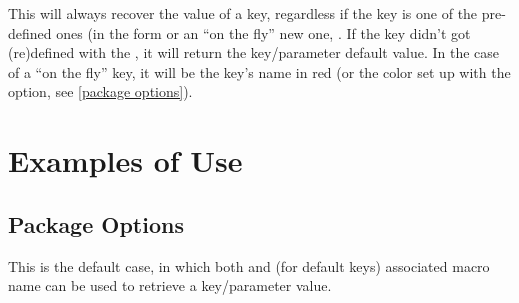 \documentclass[10pt]{article}
\begin{document}
\begin{codedescribe}{\QuestVal}
\begin{codesyntax}%
\end{codesyntax}
This will always recover the value of a key, regardless if the key is one of the pre-defined ones (in the form  or an ``on the fly'' new one, .
If the key didn't got (re)defined with the , it will return the key/parameter default value. In the case of a ``on the fly'' key, it will be the key's name in red (or the color set up with the  option, see \ref{package options}).

\end{codedescribe}

\section{Examples of Use}



\subsection{Package Options}
\begin{codestore}
\usepackage{tikzquests}
\end{codestore}

This is the default case, in which both \tsobj{\QuestVal} and (for default keys) associated macro name can be used to retrieve a key/parameter value.
\end{document}

